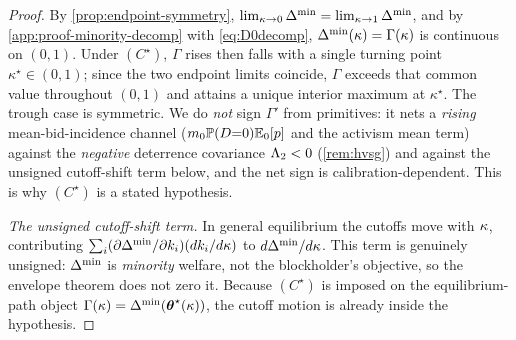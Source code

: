 \begin{proof}
By \ref{prop:endpoint-symmetry}, $\lim_{\kappa\to0}\Delta^{\min}=\lim_{\kappa\to1}\Delta^{\min}$, and
by \ref{app:proof-minority-decomp} with \eqref{eq:D0decomp},
$\Delta^{\min}(\kappa)=\Gamma(\kappa)$ is continuous on $(0,1)$. Under $(C^\star)$, $\Gamma$
rises then falls with a single turning point $\kappa^\star\in(0,1)$; since the two
endpoint limits coincide, $\Gamma$ exceeds that common value throughout $(0,1)$
and attains a unique interior maximum at $\kappa^\star$. The trough case is
symmetric. We do \emph{not} sign $\Gamma'$ from primitives: it nets a
\emph{rising} mean-bid-incidence channel ($m_0\mathbb{P}(D{=}0)\mathbb{E}_0[p]$ and the activism
mean term) against the \emph{negative} deterrence covariance $\Lambda_2<0$
(\ref{rem:hvsg}) and against the unsigned cutoff-shift term below, and the net
sign is calibration-dependent. This is why $(C^\star)$ is a stated hypothesis.

\emph{The unsigned cutoff-shift term.} In general equilibrium the cutoffs move
with $\kappa$, contributing $\sum_i(\partial\Delta^{\min}/\partial k_i)(d k_i/d\kappa)$ to
$d\Delta^{\min}/d\kappa$. This term is genuinely unsigned: $\Delta^{\min}$ is \emph{minority}
welfare, not the blockholder's objective, so the envelope theorem does not zero
it. Because $(C^\star)$ is imposed on the equilibrium-path object
$\Gamma(\kappa)=\Delta^{\min}(\boldsymbol{\theta}^{\star}(\kappa))$, the cutoff motion is already inside the
hypothesis.
\end{proof}


